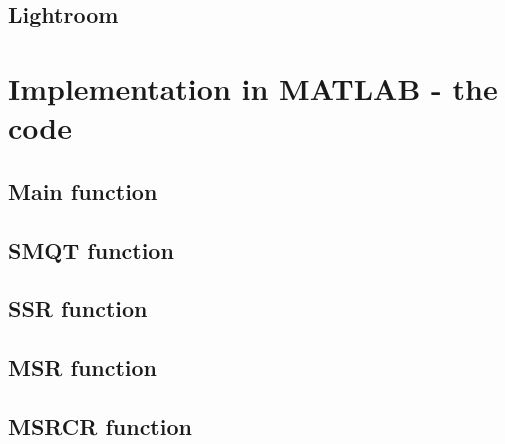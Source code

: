 \documentclass{IEEEtran}
\begin{document}
\subsection{Lightroom}

\section{Implementation in MATLAB - the code}

\subsection{Main function}


\subsection{SMQT function}
\subsection{SSR function}
\subsection{MSR function}
\subsection{MSRCR function}





\end{document}
